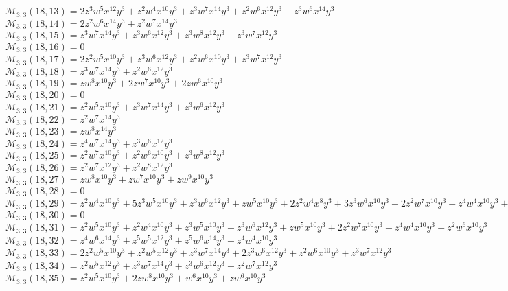 $\mathcal{M}_{3,3}(18,13)=2z^3w^5x^{12}y^3+z^2w^4x^{10}y^3+z^3w^7x^{14}y^3+z^2w^6x^{12}y^3+z^3w^6x^{14}y^3$\\
$\mathcal{M}_{3,3}(18,14)=2z^2w^6x^{14}y^3+z^2w^7x^{14}y^3$\\
$\mathcal{M}_{3,3}(18,15)=z^3w^7x^{14}y^3+z^3w^6x^{12}y^3+z^3w^8x^{12}y^3+z^3w^7x^{12}y^3$\\
$\mathcal{M}_{3,3}(18,16)=0$\\
$\mathcal{M}_{3,3}(18,17)=2z^2w^5x^{10}y^3+z^3w^6x^{12}y^3+z^2w^6x^{10}y^3+z^3w^7x^{12}y^3$\\
$\mathcal{M}_{3,3}(18,18)=z^3w^7x^{14}y^3+z^2w^6x^{12}y^3$\\
$\mathcal{M}_{3,3}(18,19)=zw^8x^{10}y^3+2zw^7x^{10}y^3+2zw^6x^{10}y^3$\\
$\mathcal{M}_{3,3}(18,20)=0$\\
$\mathcal{M}_{3,3}(18,21)=z^2w^5x^{10}y^3+z^3w^7x^{14}y^3+z^3w^6x^{12}y^3$\\
$\mathcal{M}_{3,3}(18,22)=z^2w^7x^{14}y^3$\\
$\mathcal{M}_{3,3}(18,23)=zw^8x^{14}y^3$\\
$\mathcal{M}_{3,3}(18,24)=z^4w^7x^{14}y^3+z^3w^6x^{12}y^3$\\
$\mathcal{M}_{3,3}(18,25)=z^2w^7x^{10}y^3+z^2w^6x^{10}y^3+z^3w^8x^{12}y^3$\\
$\mathcal{M}_{3,3}(18,26)=z^2w^7x^{12}y^3+z^2w^8x^{12}y^3$\\
$\mathcal{M}_{3,3}(18,27)=zw^8x^{10}y^3+zw^7x^{10}y^3+zw^9x^{10}y^3$\\
$\mathcal{M}_{3,3}(18,28)=0$\\
$\mathcal{M}_{3,3}(18,29)=z^2w^4x^{10}y^3+5z^3w^5x^{10}y^3+z^3w^6x^{12}y^3+zw^5x^{10}y^3+2z^2w^4x^8y^3+3z^3w^6x^{10}y^3+2z^2w^7x^{10}y^3+z^4w^4x^{10}y^3+z^2w^5x^8y^3$\\
$\mathcal{M}_{3,3}(18,30)=0$\\
$\mathcal{M}_{3,3}(18,31)=z^2w^5x^{10}y^3+z^2w^4x^{10}y^3+z^3w^5x^{10}y^3+z^3w^6x^{12}y^3+zw^5x^{10}y^3+2z^2w^7x^{10}y^3+z^4w^4x^{10}y^3+z^2w^6x^{10}y^3$\\
$\mathcal{M}_{3,3}(18,32)=z^4w^6x^{14}y^3+z^5w^5x^{12}y^3+z^5w^6x^{14}y^3+z^4w^4x^{10}y^3$\\
$\mathcal{M}_{3,3}(18,33)=2z^2w^5x^{10}y^3+z^2w^5x^{12}y^3+z^3w^7x^{14}y^3+2z^3w^6x^{12}y^3+z^2w^6x^{10}y^3+z^3w^7x^{12}y^3$\\
$\mathcal{M}_{3,3}(18,34)=z^2w^5x^{12}y^3+z^3w^7x^{14}y^3+z^3w^6x^{12}y^3+z^2w^7x^{12}y^3$\\
$\mathcal{M}_{3,3}(18,35)=z^2w^5x^{10}y^3+2zw^8x^{10}y^3+w^6x^{10}y^3+zw^6x^{10}y^3$\\
